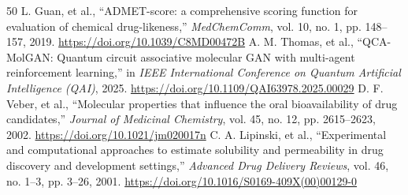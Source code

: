 \documentclass[10pt,a4paper]{article}
\begin{document}
\begin{thebibliography}{50}
 L. Guan, et al., ``ADMET-score: a comprehensive scoring function for evaluation of chemical drug-likeness,'' \textit{MedChemComm}, vol. 10, no. 1, pp. 148--157, 2019. \url{https://doi.org/10.1039/C8MD00472B}
 A. M. Thomas, et al., ``QCA-MolGAN: Quantum circuit associative molecular GAN with multi-agent reinforcement learning,'' in \textit{IEEE International Conference on Quantum Artificial Intelligence (QAI)}, 2025. \url{https://doi.org/10.1109/QAI63978.2025.00029}
 D. F. Veber, et al., ``Molecular properties that influence the oral bioavailability of drug candidates,'' \textit{Journal of Medicinal Chemistry}, vol. 45, no. 12, pp. 2615--2623, 2002. \url{https://doi.org/10.1021/jm020017n}
 C. A. Lipinski, et al., ``Experimental and computational approaches to estimate solubility and permeability in drug discovery and development settings,'' \textit{Advanced Drug Delivery Reviews}, vol. 46, no. 1--3, pp. 3--26, 2001. \url{https://doi.org/10.1016/S0169-409X(00)00129-0}
\end{thebibliography}
\end{document}

